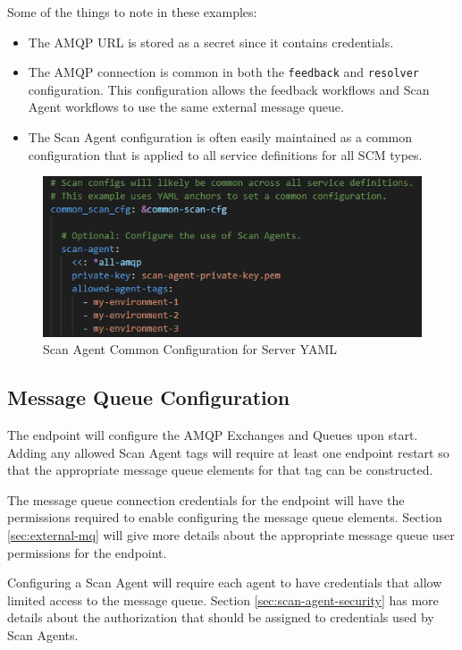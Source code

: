 Some of the things to note in these examples:

\begin{itemize}
  \item The AMQP URL is stored as a secret since it contains credentials.
  \item The AMQP connection is common in both the \texttt{feedback} and \texttt{resolver} configuration.
  This configuration allows the feedback workflows and Scan Agent workflows to use the same external message queue.
  \item The Scan Agent configuration is often easily maintained as a common configuration that is applied to 
  all service definitions for all SCM types.  
\end{itemize}


\begin{figure}[h]
    \includegraphics[scale=1]{graphics/scan-agent-config-yaml.png}
    \centering
    \caption{Scan Agent Common Configuration for Server YAML}
    \label{fig:scan-agent-config-yaml}
\end{figure}


\subsection{Message Queue Configuration}

The \cxoneflow endpoint will configure the AMQP Exchanges and Queues upon start.  Adding any
allowed Scan Agent tags will require at least one \cxoneflow endpoint restart so that the
appropriate message queue elements for that tag can be constructed.

The message queue connection credentials for the \cxoneflow endpoint will have the 
permissions required to enable configuring the message queue elements.  Section \ref{sec:external-mq}
will give more details about the appropriate message queue user permissions for the \cxoneflow endpoint.

Configuring a Scan Agent will require each agent to have credentials that allow limited
access to the message queue.  Section \ref{sec:scan-agent-security} has more details about the
authorization that should be assigned to credentials used by Scan Agents.

